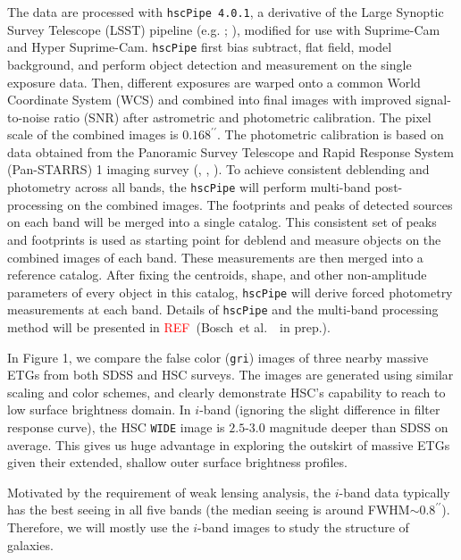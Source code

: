 \documentclass[preprint]{aastex}
\def\arcsec{{\prime\prime}}
\def\etal{{\ et al.~}}
\newcommand{\addref}{{\textcolor{red}{REF}}}
\begin{document}
\begin{CJK*}{UTF8}{gbsn}
    The data are processed with \texttt{hscPipe 4.0.1}, a derivative of the Large Synoptic
    Survey Telescope (LSST) pipeline (e.g. \citealt{Ivezic2008}; \citealt{Axelrod2010}),
    modified for use with Suprime-Cam and Hyper Suprime-Cam.  
    \texttt{hscPipe} first bias subtract, flat field, model background, and perform object
    detection and measurement on the single exposure data. 
    Then, different exposures are warped onto a common World Coordinate System (WCS) and
    combined into final images with improved signal-to-noise ratio (SNR) after astrometric
    and photometric calibration.  
    The pixel scale of the combined images is $0.168^{\arcsec}$.  
    The photometric calibration is based on data obtained from the Panoramic Survey 
    Telescope and Rapid Response System (Pan-STARRS) 1 imaging survey 
    (\citealt{Schlafly2012}, \citealt{Tonry2012}, \citealt{Magnier2013}). 
    To achieve consistent deblending and photometry across all bands, the \texttt{hscPipe}
    will perform multi-band post-processing on the combined images.  
    The footprints and peaks of detected sources on each band will be merged into a single
    catalog.    
    This consistent set of peaks and footprints is used as starting point for deblend and
    measure objects on the combined images of each band.  
    These measurements are then merged into a reference catalog.  After fixing the
    centroids, shape, and other non-amplitude parameters of every object in this catalog,
    \texttt{hscPipe} will derive forced photometry measurements at each band. 
    Details of \texttt{hscPipe} and the multi-band processing method will be presented in
    \addref~(Bosch\etal~in prep.).     
          
    In Figure 1, we compare the false color ({\tt gri}) images of three nearby massive
    ETGs from both SDSS and HSC surveys.  
    The images are generated using similar scaling and color schemes, and clearly
    demonstrate HSC's capability to reach to low surface brightness domain.  
    In $i$-band (ignoring the slight difference in filter response curve), the HSC
    \texttt{WIDE} image is $2.5$-$3.0$ magnitude deeper than SDSS on average.  
    This gives us huge advantage in exploring the outskirt of massive ETGs given their
    extended, shallow outer surface brightness profiles. 
    
    Motivated by the requirement of weak lensing analysis, the $i$-band data typically has
    the best seeing in all five bands (the median seeing is around 
    FWHM$\sim 0.8^{\arcsec}$).
    Therefore, we will mostly use the $i$-band images to study the structure of galaxies. 
    

\end{CJK*}
\end{document}
